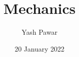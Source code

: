 \begin{titlepage}
\title{\textbf{\Huge Mechanics}}
\author{Yash Pawar}
\date{20 January 2022}
\maketitle
\end{titlepage}